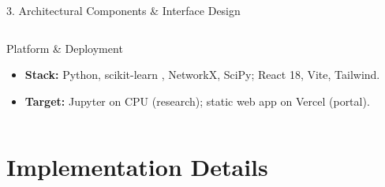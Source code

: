 \documentclass[aspectratio=169, 11pt]{beamer}
\begin{document}
\begin{frame}{3. Architectural Components \& Interface Design}
\begin{columns}[T]
        \begin{block}{Platform \& Deployment}
            \scriptsize
            \begin{itemize}
                \item \textbf{Stack:} Python, scikit-learn \cite{pedregosa2011scikit}, NetworkX, SciPy; React 18, Vite, Tailwind.
                \item \textbf{Target:} Jupyter on CPU (research); static web app on Vercel (portal).
            \end{itemize}
        \end{block}
    \end{columns}
\end{frame}

\section{Implementation Details}
\end{document}
